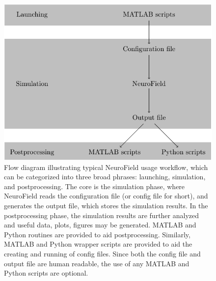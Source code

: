 \documentclass[preprint,review,10pt,authoryear,letterpaper]{elsarticle}
\begin{document}
\begin{figure}[!ht]
\begin{center}
\includegraphics{flow.pdf}
\caption{Flow diagram illustrating typical NeuroField usage workflow, which can be categorized into three broad phrases: launching, simulation, and postprocessing. The core is the simulation phase, where NeuroField reads the configuration file (or config file for short), and generates the output file, which stores the simulation results. In the postprocessing phase, the simulation results are further analyzed and useful data, plots, figures may be generated. MATLAB and Python routines are provided to aid postprocessing. Similarly, MATLAB and Python wrapper scripts are provided to aid the creating and running of config files. Since both the config file and output file are human readable, the use of any MATLAB and Python scripts are optional.}
\end{center}
\end{figure}
\end{document}
